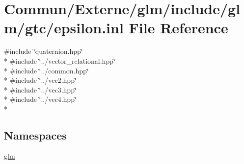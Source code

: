 \hypertarget{epsilon_8inl}{}\section{Commun/\+Externe/glm/include/glm/gtc/epsilon.inl File Reference}
\label{epsilon_8inl}
{\ttfamily \#include \char`\"{}quaternion.\+hpp\char`\"{}}\\*
{\ttfamily \#include \char`\"{}../vector\+\_\+relational.\+hpp\char`\"{}}\\*
{\ttfamily \#include \char`\"{}../common.\+hpp\char`\"{}}\\*
{\ttfamily \#include \char`\"{}../vec2.\+hpp\char`\"{}}\\*
{\ttfamily \#include \char`\"{}../vec3.\+hpp\char`\"{}}\\*
{\ttfamily \#include \char`\"{}../vec4.\+hpp\char`\"{}}\\*
\subsection*{Namespaces}
\begin{DoxyCompactItemize}
\item 
 \hyperlink{namespaceglm}{glm}
\end{DoxyCompactItemize}
